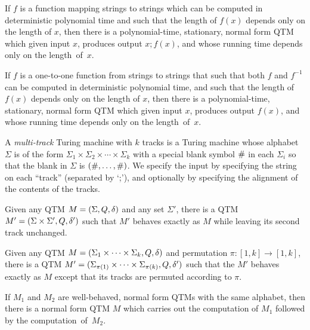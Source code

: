 \begin{theorem}
\label{synchronization}
If $f$ is a function mapping strings to strings
which can be computed in deterministic polynomial time and
such that the length of $f(x)$ depends only on the length of $x$,
then there is a polynomial-time, stationary, normal form QTM
which given input $x$, produces output $x;f(x)$,
and whose running time depends only on the
length~of~$x$.

If $f$ is a one-to-one function from strings to strings that such that both
$f$ and $f^{-1}$ can be computed in deterministic polynomial time,
and such that the length of $f(x)$ depends only on the length of $x$,
then there is a polynomial-time, stationary, normal form QTM
which given input $x$, produces output $f(x)$,
and whose running time depends only on the
length~of~$x$.
\end{theorem}

\begin{definition} A {\em multi-track\/} Turing machine with $k$ tracks
is a Turing machine whose alphabet $\Sigma$ is of the form
$\Sigma_1 \times \Sigma_2 \times \cdots \times \Sigma_k$ with a special
blank symbol ${\#}$ in each $\Sigma_i$ so that the blank in $\Sigma$ is
$({\#},\ldots,{\#})$. We specify the input by specifying the string on each
``track'' (separated by `;'), and optionally by specifying the
alignment of the contents of the tracks.
\end{definition}

\begin{lemma}
\label{extension.lemma}
Given any QTM
$M = (\Sigma,Q,{\delta})$ and any
set $\Sigma'$, there is a QTM
\mbox{$M' = (\Sigma \times \Sigma',Q,{\delta}')$} such that $M'$
behaves exactly as $M$ while leaving its second track \mbox{unchanged}.
\end{lemma}

\begin{lemma}
\label{permutation.lemma}
Given any QTM
$M = (\Sigma_1 \times \cdots \times \Sigma_k,Q,{\delta})$
and permutation $\pi : [1,k] \rightarrow [1,k]$, there is a QTM
$M' = (\Sigma_{\pi(1)} \times \cdots \times \Sigma_{\pi(k)},Q,{\delta}')$
such that the $M'$ behaves exactly as $M$ except that its tracks are
permuted according to $\pi$.
\end{lemma}

\begin{lemma}
\label{dovetailing}
If $M_1$ and $M_2$ are well-behaved, normal form QTMs
with the same alphabet, then there is a normal form QTM
$M$ which carries out the computation of $M_1$ followed by the
computation~of~$M_2$.
\end{lemma}

